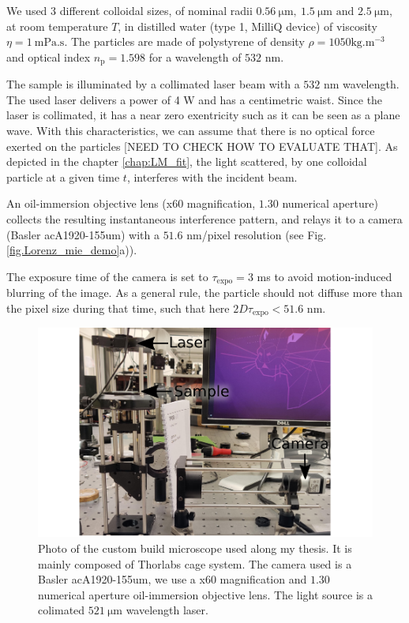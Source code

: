 We used 3 different colloidal sizes, of nominal radii $0.56 ~ \mathrm{\mu m}, ~ 1.5 ~ \mathrm{\mu m} \text{ and } 2.5 ~ \mathrm{\mu m} $, at room temperature $T$, in distilled water (type 1, MilliQ device) of viscosity $\eta = 1 ~ \mathrm{mPa.s}$. The particles are made of polystyrene of density $\rho = 1050 \mathrm{kg.m^{-3}}$ and optical index $n_\mathrm{p} = 1.598$ for a wavelength of $532$ nm.

 The sample is illuminated by a collimated laser beam with a $532$ nm wavelength. The used laser delivers a power of 4 W and has a centimetric waist. Since the laser is collimated, it has a near zero exentricity such as it can be seen as a plane wave. With this characteristics, we can assume that there is no optical force exerted on the particles [NEED TO CHECK HOW TO EVALUATE THAT]. As depicted in the chapter \ref{chap:LM_fit}, the light scattered, by one colloidal particle at a given time $t$, interferes with the incident beam. 
 
 An oil-immersion objective lens (x60 magnification, $1.30$ numerical aperture) collects the resulting instantaneous interference pattern, and relays it to a camera (Basler acA1920-155um) with a $51.6$ nm/pixel resolution (see Fig.\ref{fig.Lorenz_mie_demo}a)). 
 
 The exposure time of the camera is set to $\tau_{\mathrm{expo}} = 3$ ms to avoid motion-induced blurring of the image. As a general rule, the particle should not diffuse more than the pixel size during that time, such that here $2D\tau_{\mathrm{expo}} < 51.6$ nm.

\begin{figure}[!ht]
	\centering
	\includegraphics{02_body/chapter2/images/figures_setup/photo_setup.pdf}
	\caption{Photo of the custom build microscope used along my thesis. It is mainly composed of Thorlabs cage system. The camera used is a Basler acA1920-155um, we use a x60 magnification and $1.30$ numerical aperture oil-immersion objective lens. The light source is a colimated  $521 ~ \mathrm{\mu m}$ wavelength laser.}
	\label{fig:picture}
\end{figure}

